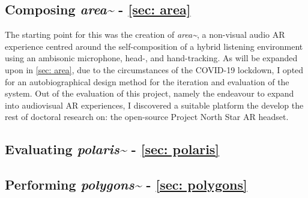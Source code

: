 \subsection{Composing \textit{area\textasciitilde{}} - \autoref{sec: area}}
The starting point for this was the creation of \textit{area\textasciitilde{}}, a non-visual audio AR experience centred around the self-composition of a hybrid listening environment using an ambisonic microphone, head-, and hand-tracking. As will be expanded upon in \autoref{sec: area}, due to the circumstances of the COVID-19 lockdown, I opted for an autobiographical design method for the iteration and evaluation of the system. Out of the evaluation of this project, namely the endeavour to expand into audiovisual AR experiences, I discovered a suitable platform the develop the rest of doctoral research on: the open-source Project North Star AR headset.

\subsection{Evaluating \textit{polaris\textasciitilde{}} - \autoref{sec: polaris}}


\subsection{Performing \textit{polygons\textasciitilde{}} - \autoref{sec: polygons}}

